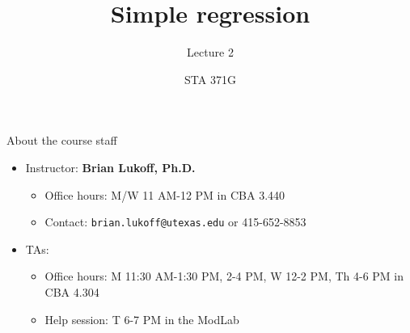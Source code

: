 \documentclass{beamer}\usepackage[]{graphicx}\usepackage[]{color}
\title{Simple regression}
\subtitle{Lecture 2}
\author{STA 371G}
\begin{document}
  
  
  

  \frame{\maketitle}



  \begin{darkframes}
    \begin{frame}{About the course staff}
      \begin{itemize}
        \item Instructor: \textbf{Brian Lukoff, Ph.D.}
          \begin{itemize}
            \item Office hours: M/W 11 AM-12 PM in CBA 3.440
            \item Contact: \texttt{brian.lukoff@utexas.edu} or 415-652-8853
          \end{itemize}
        \item TAs:
          \begin{itemize}
            \item Office hours: M 11:30 AM-1:30 PM, 2-4 PM, W 12-2 PM, Th 4-6 PM in CBA 4.304
            \item Help session: T 6-7 PM in the ModLab
          \end{itemize}


\end{itemize}
\end{frame}
\end{darkframes}
\end{document}
